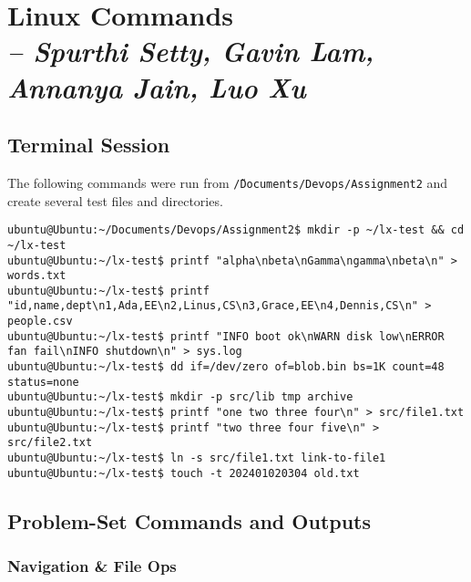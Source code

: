 \chapter{Linux Commands \\
\small{\textit{-- Spurthi Setty, Gavin Lam, Annanya Jain, Luo Xu}}
\label{Chapter::Linux Commands}}

\section{Terminal Session}

The following commands were run from
\texttt{\~/Documents/Devops/Assignment2} and create several test files
and directories.

\begin{Verbatim}[formatcom=\color{blue}]
ubuntu@Ubuntu:~/Documents/Devops/Assignment2$ mkdir -p ~/lx-test && cd ~/lx-test
ubuntu@Ubuntu:~/lx-test$ printf "alpha\nbeta\nGamma\ngamma\nbeta\n" > words.txt
ubuntu@Ubuntu:~/lx-test$ printf "id,name,dept\n1,Ada,EE\n2,Linus,CS\n3,Grace,EE\n4,Dennis,CS\n" > people.csv
ubuntu@Ubuntu:~/lx-test$ printf "INFO boot ok\nWARN disk low\nERROR fan fail\nINFO shutdown\n" > sys.log
ubuntu@Ubuntu:~/lx-test$ dd if=/dev/zero of=blob.bin bs=1K count=48 status=none
ubuntu@Ubuntu:~/lx-test$ mkdir -p src/lib tmp archive
ubuntu@Ubuntu:~/lx-test$ printf "one two three four\n" > src/file1.txt
ubuntu@Ubuntu:~/lx-test$ printf "two three four five\n" > src/file2.txt
ubuntu@Ubuntu:~/lx-test$ ln -s src/file1.txt link-to-file1
ubuntu@Ubuntu:~/lx-test$ touch -t 202401020304 old.txt
\end{Verbatim}

\section{Problem-Set Commands and Outputs}

\subsection{Navigation \& File Ops}

